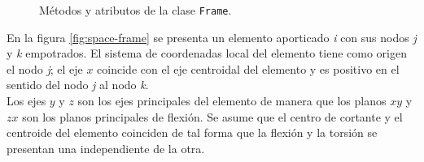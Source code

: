 \begin{figure}[ht]
  \centering
  \caption{Métodos y atributos de la clase \texttt{Frame}.}
  \label{fig:pyFEM-Frame}
\end{figure}

En la figura \ref{fig:space-frame} se presenta un elemento aporticado \emph{i} con sus nodos \emph{j} y \emph{k} empotrados. El sistema de coordenadas local del elemento tiene como origen el nodo \emph{j}; el eje $ x $ coincide con el eje centroidal del elemento y es positivo en el sentido del nodo \emph{j} al nodo \emph{k}.\\

Los ejes $ y $ y $ z $ son los ejes principales del elemento de manera que los planos $ xy $ y $ zx $ son los planos principales de flexión. Se asume que el centro de cortante y el centroide del elemento coinciden de tal forma que la flexión y la torsión se presentan una independiente de la otra.\\

